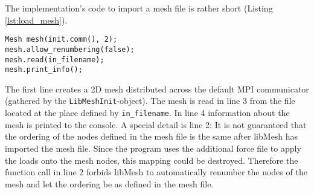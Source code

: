    The implementation's code to import a mesh file is rather short (Listing \ref{lst:load_mesh}).
\begin{lstlisting}[caption=Loading mesh and prepare for use,label=lst:load_mesh,keepspaces=true]
Mesh mesh(init.comm(), 2);
mesh.allow_renumbering(false);
mesh.read(in_filename);	
mesh.print_info();
\end{lstlisting}   
   The first line creates a 2D mesh distributed across the default MPI communicator (gathered by the \texttt{LibMeshInit}-object). The mesh is read in line 3 from the file located at the place defined by \texttt{in\_filename}. In line 4 information about the mesh is printed to the console. A special detail is line 2: It is not guaranteed that the ordering of the nodes defined in the mesh file is the same after libMesh has imported the mesh file. Since the program uses the additional force file to apply the loads onto the mesh nodes, this mapping could be destroyed. Therefore the function call in line 2 forbids libMesh to automatically renumber the nodes of the mesh and let the ordering be as defined in the mesh file.


